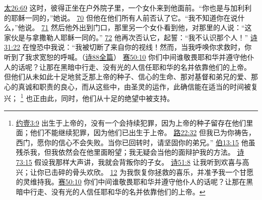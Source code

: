 \documentclass[12pt, a4paper, oneside]{ctexart}
\begin{document}
{		\href{https://biblehub.com/matthew/26-69.htm}{太26:69} 这时，彼得正坐在户外院子里，一个女仆来到他面前。“你也是与加利利的耶稣一同的，”她说。
		\href{https://biblehub.com/matthew/26-70.htm}{70} 但他在他们所有人前否认了它。“我不知道你在说什么，”他说。
		\href{https://biblehub.com/matthew/26-71.htm}{71} 然后他外出到门口，那里另一个女仆看到他，对那里的人说：“这家伙是与拿撒勒人耶稣一同的。”
		\href{https://biblehub.com/matthew/26-72.htm}{72} 他再次否认它，起誓：“我不认识那个人！”
		\href{https://biblehub.com/psalms/31-22.htm}{诗31:22} 在惶恐中我说：“我被切断了来自你的视线！然而，当我呼唤你求救时，你听到了我求宽恕的呼喊。（\href{https://biblehub.com/niv/psalms/88.htm}{诗88全篇}）
		\href{https://biblehub.com/isaiah/50-10.htm}{赛50:10} 你们中间谁敬畏耶和华并遵守他仆人的话呢？让那在黑暗中行走、没有光的人信任耶和华的名并依靠他们的上帝。
	}
	但他们从未如此十足地贫乏那上帝的种子、信心的生命、那对基督和弟兄的爱、那心的真诚和职责的良心，而从这些中，由圣灵的运作，此确信能在适当的时间被复兴；
	\footnote {
		\href{https://biblehub.com/1_john/3-9.htm}{约壹3:9} 出生于上帝的，没有一个会持续犯罪，因为上帝的种子留存在他们里面；他们不能继续犯罪，因为他们已出生于上帝。
		\href{https://biblehub.com/luke/22-32.htm}{路22:32} 但我已为你祷告，西门，愿你的信心不会失败。当你已回转时，请坚固你的弟兄。”
		\href{https://biblehub.com/job/13-15.htm}{伯13:15} 他虽残杀我，但我依然会在他里面盼望；我无疑会当他的面辩护我的方法。
		\href{https://biblehub.com/psalms/73-15.htm}{诗73:15} 假设我那样大声讲，我就会背叛你的子女。
		\href{https://biblehub.com/psalms/51-8.htm}{诗51:8} 让我听到欢喜与高兴；让你已击碎的骨头欢欣。
		\href{https://biblehub.com/psalms/51-12.htm}{12} 为我恢复你拯救的喜乐，并准予我一个甘愿的灵维持我。\href{https://biblehub.com/isaiah/50-10.htm}{赛50:10} 你们中间谁敬畏耶和华并遵守他仆人的话呢？让那在黑暗中行走、没有光的人信任耶和华的名并依靠他们的上帝。
	}
	也正由此，同时，他们从十足的绝望中被支持。
\end{document}

